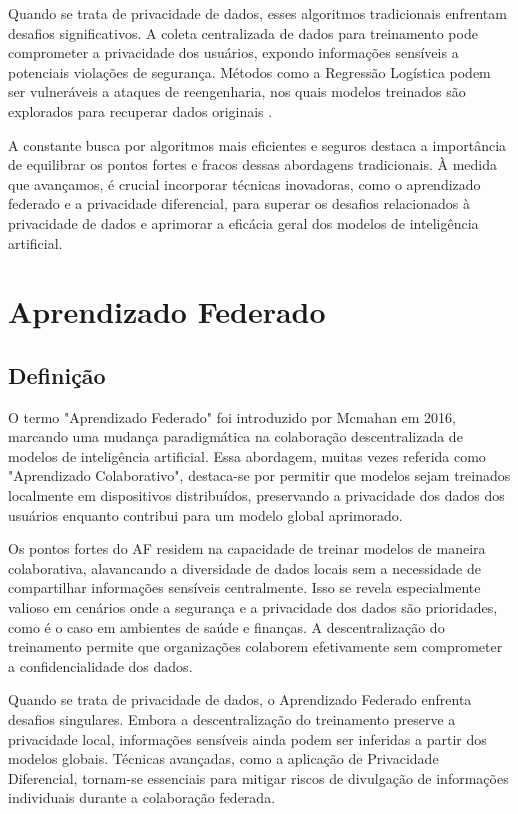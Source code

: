  Quando se trata de privacidade de dados, esses algoritmos tradicionais enfrentam desafios significativos. A coleta centralizada de dados para treinamento pode comprometer a privacidade dos usuários, expondo informações sensíveis a potenciais violações de segurança. Métodos como a Regressão Logística podem ser vulneráveis a ataques de reengenharia, nos quais modelos treinados são explorados para recuperar dados originais \cite{fredrikson2014privacy}.

 A constante busca por algoritmos mais eficientes e seguros destaca a importância de equilibrar os pontos fortes e fracos dessas abordagens tradicionais. À medida que avançamos, é crucial incorporar técnicas inovadoras, como o aprendizado federado e a privacidade diferencial, para superar os desafios relacionados à privacidade de dados e aprimorar a eficácia geral dos modelos de inteligência artificial.

\section{Aprendizado Federado}
\label{sec:federado}

\subsection{Definição}

O termo "Aprendizado Federado" foi introduzido por Mcmahan em 2016, marcando uma mudança paradigmática na colaboração descentralizada de modelos de inteligência artificial\cite{mcmahan2017communication}. Essa abordagem, muitas vezes referida como "Aprendizado Colaborativo", destaca-se por permitir que modelos sejam treinados localmente em dispositivos distribuídos, preservando a privacidade dos dados dos usuários enquanto contribui para um modelo global aprimorado.

Os pontos fortes do AF residem na capacidade de treinar modelos de maneira colaborativa, alavancando a diversidade de dados locais sem a necessidade de compartilhar informações sensíveis centralmente. Isso se revela especialmente valioso em cenários onde a segurança e a privacidade dos dados são prioridades, como é o caso em ambientes de saúde e finanças. A descentralização do treinamento permite que organizações colaborem efetivamente sem comprometer a confidencialidade dos dados\cite{yang2019federated}.

Quando se trata de privacidade de dados, o Aprendizado Federado enfrenta desafios singulares. Embora a descentralização do treinamento preserve a privacidade local, informações sensíveis ainda podem ser inferidas a partir dos modelos globais. Técnicas avançadas, como a aplicação de Privacidade Diferencial, tornam-se essenciais para mitigar riscos de divulgação de informações individuais durante a colaboração federada\cite{geyer2017differentially}.

